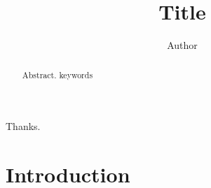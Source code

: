 \documentclass{kaumasters}
\title{Title}
\author{Author}
\institute{Department of Mathematics and Computer Science}
\begin{document}
\frontmatter
\begin{abstract}
  Abstract.
  \keywords keywords
\end{abstract}
\approvalpage%
\begin{acknowledgements}
  Thanks.
\end{acknowledgements}
\tableofcontents
\mainmatter
\section{Introduction}
\end{document}
